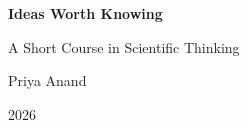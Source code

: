 \documentclass[10pt]{book}
\begin{document}
\begin{titlepage}
\centering
\vspace*{3cm}
{\Huge\bfseries Ideas Worth Knowing\par}
\vspace{0.5cm}
{\Large A Short Course in Scientific Thinking\par}
\vspace{2cm}
{\large Priya Anand\par}
\vfill
{\large 2026\par}
\end{titlepage}

\frontmatter
\tableofcontents




\mainmatter




\backmatter


\end{document}
